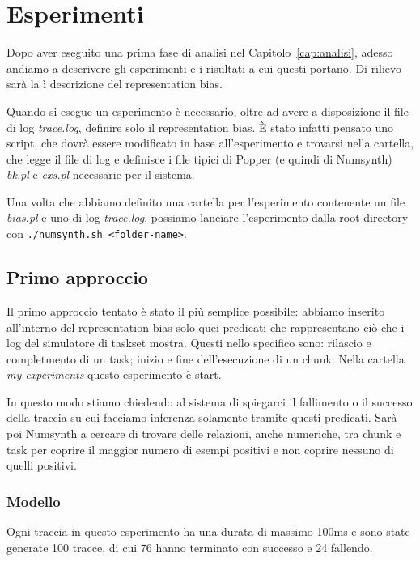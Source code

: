 \chapter{Esperimenti}
Dopo aver eseguito una prima fase di analisi nel Capitolo~\ref{cap:analisi}, adesso andiamo a descrivere gli esperimenti e i risultati a cui questi portano. Di rilievo sarà la ì descrizione del representation bias.

\myskip

Quando si esegue un esperimento è necessario, oltre ad avere a disposizione il file di log \textit{trace.log}, definire solo il representation bias. È stato infatti pensato uno script, che dovrà essere modificato in base all'esperimento e trovarsi nella cartella, che legge il file di log e definisce i file tipici di Popper (e quindi di Numsynth) \textit{bk.pl} e \textit{exs.pl} necessarie per il sistema.

Una volta che abbiamo definito una cartella per l'esperimento contenente un file \textit{bias.pl} e uno di log \textit{trace.log}, possiamo lanciare l'esperimento dalla root directory con \texttt{./numsynth.sh <folder-name>}.

\section{Primo approccio}
Il primo approccio tentato è stato il più semplice possibile: abbiamo inserito all'interno del representation bias solo quei predicati che rappresentano ciò che i log del simulatore di taskset mostra. Questi nello specifico sono: rilascio e completmento di un task; inizio e fine dell'esecuzione di un chunk. Nella cartella \textit{my-experiments} questo esperimento è \href{https://github.com/edoardosarri24/numsynth/tree/main/my-experiments/1-start/}{start}.

In questo modo stiamo chiedendo al sistema di spiegarci il fallimento o il successo della traccia su cui facciamo inferenza solamente tramite questi predicati. Sarà poi Numsynth a cercare di trovare delle relazioni, anche numeriche, tra chunk e task per coprire il maggior numero di esempi positivi e non coprire nessuno di quelli positivi.

\subsection{Modello}
\label{subsec:mod-primo-approccio}
Ogni traccia in questo esperimento ha una durata di massimo 100ms e sono state generate 100 tracce, di cui 76 hanno terminato con successo e 24 fallendo.

